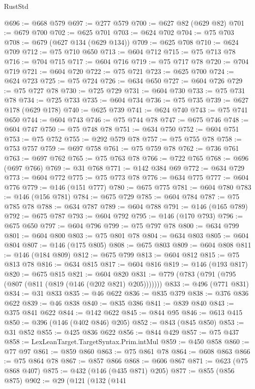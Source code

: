 \begin{lexlean}{RustStd}
\begin{coremodule}
@696 := @668 @579
@697 := @277 @579
@700 := @627 @82 (@629 @82)
@701 := @679 @700
@702 := @625 @701
@703 := @624 @702
@704 := @75 @703
@708 := @679 (@627 @134 (@629 @134))
@709 := @625 @708
@710 := @624 @709
@712 := @75 @710 @650
@713 := @604 @712
@715 := @75 @713 @78
@716 := @704 @715
@717 := @604 @716
@719 := @75 @717 @78
@720 := @704 @719
@721 := @604 @720
@722 := @75 @721
@723 := @625 @700
@724 := @624 @723
@725 := @75 @724
@726 := @634 @650
@727 := @604 @726
@729 := @75 @727 @78
@730 := @725 @729
@731 := @604 @730
@733 := @75 @731 @78
@734 := @725 @733
@735 := @604 @734
@736 := @75 @735
@739 := @627 @178 (@629 @178)
@740 := @625 @739
@741 := @624 @740
@743 := @75 @741 @650
@744 := @604 @743
@746 := @75 @744 @78
@747 := @675 @746
@748 := @604 @747
@750 := @75 @748 @78
@751 := @634 @750
@752 := @604 @751
@753 := @75 @752
@755 := @292 @579 @78
@757 := @75 @755 @78
@758 := @753 @757
@759 := @697 @758
@761 := @75 @759 @78
@762 := @736 @761
@763 := @697 @762
@765 := @75 @763 @78
@766 := @722 @765
@768 := @696 (@697 @766)
@769 := @31 @768
@771 := @142 @384 @69
@772 := @634 @729
@773 := @604 @772
@775 := @75 @773 @78
@776 := @634 @775
@777 := @604 @776
@779 := @146 (@151 @777)
@780 := @675 @775
@781 := @604 @780
@783 := @146 (@156 @781)
@784 := @675 @729
@785 := @604 @784
@787 := @75 @785 @78
@788 := @634 @787
@789 := @604 @788
@791 := @146 (@165 @789)
@792 := @675 @787
@793 := @604 @792
@795 := @146 (@170 @793)
@796 := @675 @650
@797 := @604 @796
@799 := @75 @797 @78
@800 := @634 @799
@801 := @604 @800
@803 := @75 @801 @78
@804 := @634 @803
@805 := @604 @804
@807 := @146 (@175 @805)
@808 := @675 @803
@809 := @604 @808
@811 := @146 (@184 @809)
@812 := @675 @799
@813 := @604 @812
@815 := @75 @813 @78
@816 := @634 @815
@817 := @604 @816
@819 := @146 (@193 @817)
@820 := @675 @815
@821 := @604 @820
@831 := @779 (@783 (@791 (@795 (@807 (@811 (@819 (@146 (@202 @821) @205)))))))
@833 := @496 (@771 @831)
@834 := @31 @833
@835 := @46 @622
@836 := @835 @379
@838 := @376 @836 @622
@839 := @46 @838
@840 := @835 @386
@841 := @839 @840
@843 := @375 @841 @622
@844 := @142 @622
@845 := @844 @95
@846 := @613 @415
@850 := @396 (@146 (@402 @846) @205)
@852 := @843 (@845 @850)
@853 := @31 @852
@855 := @425 @836 @622
@856 := @844 @429
@857 := @75 @437
@858 := LexLeanTarget.TargetSyntax.Prim.intMul
@859 := @450 @858
@860 := @77 @97
@861 := @859 @860
@863 := @75 @861 @78
@864 := @608 @863
@866 := @75 @864 @78
@867 := @857 @866
@868 := @606 @867
@871 := @623 (@75 @868 @407)
@875 := @432 (@146 (@435 @871) @205)
@877 := @855 (@856 @875)
@902 := @29
    (@121
      (@132
        (@141

\end{coremodule}
\end{lexlean}
